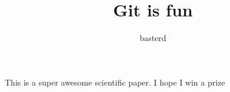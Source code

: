 \documentclass[10pt]{article}
\author{basterd}
\title{Git is fun}
\begin{document}
	\maketitle

	This is a super awesome scientific paper.
	I hope I win a prize
\end{document}
